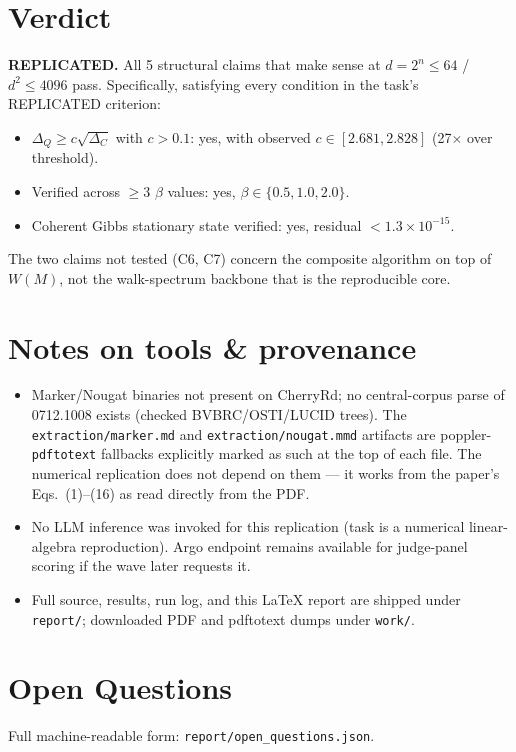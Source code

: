 \documentclass[11pt]{article}
\begin{document}
\section{Verdict}
\textbf{REPLICATED.} All 5 structural claims that make sense at
$d = 2^n \le 64$ / $d^2 \le 4096$ pass. Specifically, satisfying every
condition in the task's REPLICATED criterion:
\begin{itemize}
  \item $\Delta_Q \ge c\sqrt{\Delta_C}$ with $c > 0.1$: yes, with observed
    $c \in [2.681, 2.828]$ (27$\times$ over threshold).
  \item Verified across $\ge 3$ $\beta$ values: yes, $\beta \in \{0.5, 1.0, 2.0\}$.
  \item Coherent Gibbs stationary state verified: yes, residual
    $< 1.3\times 10^{-15}$.
\end{itemize}
The two claims not tested (C6, C7) concern the composite algorithm on top
of $W(M)$, not the walk-spectrum backbone that is the reproducible core.

\section{Notes on tools \& provenance}
\begin{itemize}
  \item Marker/Nougat binaries not present on CherryRd; no central-corpus
    parse of 0712.1008 exists (checked BVBRC/OSTI/LUCID trees). The
    \texttt{extraction/marker.md} and \texttt{extraction/nougat.mmd}
    artifacts are poppler-\texttt{pdftotext} fallbacks explicitly marked
    as such at the top of each file. The numerical replication does not
    depend on them --- it works from the paper's Eqs.\ (1)--(16) as read
    directly from the PDF.
  \item No LLM inference was invoked for this replication (task is a
    numerical linear-algebra reproduction). Argo endpoint remains
    available for judge-panel scoring if the wave later requests it.
  \item Full source, results, run log, and this LaTeX report are shipped
    under \texttt{report/}; downloaded PDF and pdftotext dumps under
    \texttt{work/}.
\end{itemize}

\section*{Open Questions}
Full machine-readable form: \texttt{report/open\_questions.json}.
\end{document}
